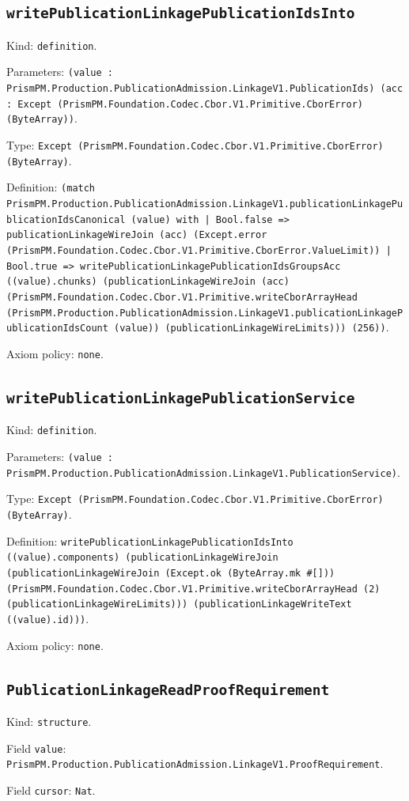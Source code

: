 \documentclass[11pt]{article}
\begin{document}
\subsection*{\texttt{writePublicationLinkagePublicationIdsInto}}
\noindent Kind: \texttt{definition}.\par
\noindent Parameters: \texttt{(value : PrismPM.Production.PublicationAdmission.LinkageV1.PublicationIds) (acc : Except (PrismPM.Foundation.Codec.Cbor.V1.Primitive.CborError) (ByteArray))}.\par
\noindent Type: \texttt{Except (PrismPM.Foundation.Codec.Cbor.V1.Primitive.CborError) (ByteArray)}.\par
\noindent Definition: \texttt{(match PrismPM.Production.PublicationAdmission.LinkageV1.publicationLinkagePublicationIdsCanonical (value) with | Bool.false => publicationLinkageWireJoin (acc) (Except.error (PrismPM.Foundation.Codec.Cbor.V1.Primitive.CborError.ValueLimit)) | Bool.true => writePublicationLinkagePublicationIdsGroupsAcc ((value).chunks) (publicationLinkageWireJoin (acc) (PrismPM.Foundation.Codec.Cbor.V1.Primitive.writeCborArrayHead (PrismPM.Production.PublicationAdmission.LinkageV1.publicationLinkagePublicationIdsCount (value)) (publicationLinkageWireLimits))) (256))}.\par
\noindent Axiom policy: \texttt{none}.\par
\subsection*{\texttt{writePublicationLinkagePublicationService}}
\noindent Kind: \texttt{definition}.\par
\noindent Parameters: \texttt{(value : PrismPM.Production.PublicationAdmission.LinkageV1.PublicationService)}.\par
\noindent Type: \texttt{Except (PrismPM.Foundation.Codec.Cbor.V1.Primitive.CborError) (ByteArray)}.\par
\noindent Definition: \texttt{writePublicationLinkagePublicationIdsInto ((value).components) (publicationLinkageWireJoin (publicationLinkageWireJoin (Except.ok (ByteArray.mk \#[])) (PrismPM.Foundation.Codec.Cbor.V1.Primitive.writeCborArrayHead (2) (publicationLinkageWireLimits))) (publicationLinkageWriteText ((value).id)))}.\par
\noindent Axiom policy: \texttt{none}.\par
\subsection*{\texttt{PublicationLinkageReadProofRequirement}}
\noindent Kind: \texttt{structure}.\par
\noindent Field \texttt{value}: \texttt{PrismPM.Production.PublicationAdmission.LinkageV1.ProofRequirement}.\par
\noindent Field \texttt{cursor}: \texttt{Nat}.\par
\end{document}
